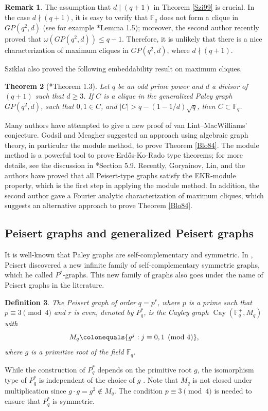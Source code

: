 \documentclass[12pt,reqno]{amsart}
\newtheorem{thm}{Theorem}[section]
\newtheorem{defn}[thm]{Definition}
\theoremstyle{definition}
\newtheorem{rem}[thm]{Remark}
\newcommand{\F}{\mathbb{F}}
\begin{document}
\begin{rem}
The assumption that $d \mid (q+1)$ in Theorem \ref{Szi99} is crucial. In the case $d \nmid (q+1)$, it is easy to verify that $\F_{q}$ does not form a clique in $GP(q^2,d)$ (see for example \cite{Yip4}*{Lemma 1.5}); moreover, the second author \cite{Yip4} recently proved that $\omega(GP(q^2,d))\leq q-1$. Therefore, it is unlikely that there is a nice characterization of maximum cliques in $GP(q^2,d)$, where $d \nmid (q+1)$.
\end{rem}

Sziklai \cite{Szi99} also proved the following embeddability result on maximum cliques. 

\begin{thm}[\cite{Szi99}*{Theorem 1.3}] \label{embed}
Let $q$ be an odd prime power and $d$ a divisor of $(q+1)$ such that $d \geq 3$. If $C$ is a clique in the generalized Paley graph $GP(q^2,d)$, such that $0,1 \in C$, and $|C|>q-(1-1/d)\sqrt{q}$, then $C \subset \F_q$. 
\end{thm}

Many authors have attempted to give a new proof of van Lint--MacWilliams' conjecture. Godsil and Meagher \cite{GM} suggested an approach using algebraic graph theory, in particular the module method, to prove Theorem \ref{Blo84}. The module method is a powerful tool to prove Erd\H{o}s-{K}o-{R}ado type theorems; for more details, see the discussion in \cite{GM}*{Section 5.9}. Recently, Goryainov, Lin, and the authors \cite{AGLY22} have proved that all Peisert-type graphs satisfy the EKR-module property, which is the first step in applying the module method. In addition, the second author \cite{Yip4} gave a Fourier analytic characterization of maximum cliques, which suggests an alternative approach to prove Theorem \ref{Blo84}. 


\subsection{Peisert graphs and generalized Peisert graphs}\label{subsect:peisert}
It is well-known that Paley graphs are self-complementary and symmetric. In \cite{WP2}, Peisert discovered a new infinite family of self-complementary symmetric graphs, which he called $P^*$-graphs. This new family of graphs also goes under the name of Peisert graphs in the literature. 

\begin{defn}
The {\em Peisert graph} of order $q=p^r$, where $p$ is a prime such that $p \equiv 3 \pmod 4$ and $r$ is even, denoted by $P^*_q$, is the Cayley graph $\operatorname{Cay}(\F_{q}^{+}, M_q)$ with $$M_q \colonequals \{g^j: j \equiv 0,1 \pmod 4\},$$ where $g$ is a primitive root of the field $\F_q$.
\end{defn}
While the construction of $P^*_q$ depends on the primitive root $g$, the isomorphism type of $P^*_q$ is independent of the choice of $g$ \cite{WP2}.  Note that $M_q$ is not closed under multiplication since $g \cdot g=g^2 \notin M_q$. The condition $p \equiv 3 \pmod 4$ is needed to ensure that $P_q^*$ is symmetric.
\end{document}
